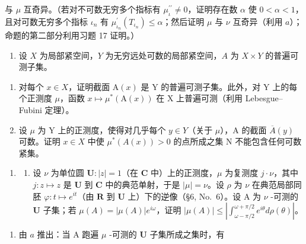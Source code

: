 与 \(\mu\) 互奇异。（若对不可数无穷多个指标有 \(\mu_{\iota}^{\prime\prime} \neq 0\)，证明存在数 \(\alpha\) 使 \(0 < \alpha < 1\)，且对可数无穷多个指标 \(\iota_{n}\) 有 \(\mu_{\iota_{n}}^{\prime}(T_{\iota_{n}}) \leqslant \alpha\)；然后证明 \(\mu\) 与 \(\nu\) 互奇异（利用 \(a\)）；命题的第二部分利用习题 17 证明。）

\begin{enumerate}
\def\labelenumi{\arabic{enumi})}
\setcounter{enumi}{18}
\tightlist
\item
  设 \(X\) 为局部紧空间，\(Y\) 为无穷远处可数的局部紧空间，\(A\) 为 \(X \times Y\) 的普遍可测子集。
\end{enumerate}

\begin{enumerate}
\def\labelenumi{\alph{enumi})}
\item
  对每个 \(x \in X\)，证明截面 \(\mathrm{A}(x)\) 是 Y 的普遍可测子集。此外，对 Y 上的每个正测度 \(\mu\)，函数 \(x \mapsto \mu^{*}(\mathrm{A}(x))\) 在 X 上普遍可测（利用 Lebesgue--Fubini 定理）。
\item
  设 \(\mu\) 为 Y 上的正测度，使得对几乎每个 \(y \in Y\)（关于 \(\mu\)），A 的截面 \(\overline{A}(y)\) 可数。证明 \(x \in X\) 中使 \(\mu^{*}(A(x)) > 0\) 的点所成之集 N 不能包含任何可数紧集。
\end{enumerate}

\begin{enumerate}
\def\labelenumi{\arabic{enumi})}
\setcounter{enumi}{19}
\tightlist
\item
  \begin{enumerate}
  \def\labelenumii{\alph{enumii})}
  \tightlist
  \item
    设 \(\nu\) 为单位圆 \(\mathbf{U}: |z| = 1\)（在 \(\mathbf{C}\) 中）上的正测度，\(\mu\) 为复测度 \(j \cdot \nu\)，其中 \(j: z \mapsto z\) 是 \(\mathbf{U}\) 到 \(\mathbf{C}\) 中的典范单射，于是 \(|\mu| = \nu\)。设 \(\rho\) 为 \(\nu\) 在典范局部同胚 \(\varphi: t \mapsto e^{it}\)（由 \(\mathbf{R}\) 到 \(\mathbf{U}\) 上）下的逆像（§6, No.~6）。设 A 为 \(\nu\) -可测的 \(\mathbf{U}\) 子集；若 \(\mu(A) = |\mu(A)|e^{i\omega}\)，证明 \(|\mu(A)| \leqslant \left|\int_{\omega - \pi/2}^{\omega + \pi/2} e^{i\theta} d\rho(\theta)\right|\)。
  \end{enumerate}
\end{enumerate}

\begin{enumerate}
\def\labelenumi{\alph{enumi})}
\setcounter{enumi}{1}
\tightlist
\item
  由 \(a\) 推出：当 A 跑遍 \(\mu\) -可测的 \(\mathbf{U}\) 子集所成之集时，有
\end{enumerate}

